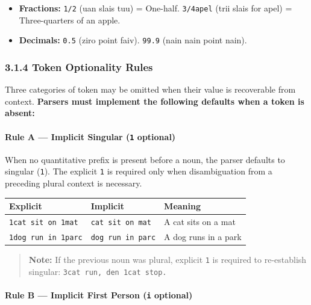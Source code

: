 \begin{itemize}
\tightlist
\item
  \textbf{Fractions:} \texttt{1/2} (uan slais tuu) = One-half.
  \texttt{3/4apel} (trii slais for apel) = Three-quarters of an apple.
\item
  \textbf{Decimals:} \texttt{0.5} (ziro point faiv). \texttt{99.9} (nain
  nain point nain).
\end{itemize}

\subsubsection{3.1.4 Token Optionality
Rules}\label{token-optionality-rules}

Three categories of token may be omitted when their value is recoverable
from context. \textbf{Parsers must implement the following defaults when
a token is absent:}

\paragraph{\texorpdfstring{Rule A --- Implicit Singular (\texttt{1}
optional)}{Rule A --- Implicit Singular (1 optional)}}\label{rule-a-implicit-singular-1-optional}

When no quantitative prefix is present before a noun, the parser
defaults to singular (\texttt{1}). The explicit \texttt{1} is required
only when disambiguation from a preceding plural context is necessary.

{\def\LTcaptype{} %
\begin{longtable}[]{@{}lll@{}}
\toprule\noalign{}
Explicit & Implicit & Meaning \\
\midrule\noalign{}
\endhead
\bottomrule\noalign{}
\endlastfoot
\texttt{1cat\ sit\ on\ 1mat} & \texttt{cat\ sit\ on\ mat} & A cat sits
on a mat \\
\texttt{1dog\ run\ in\ 1parc} & \texttt{dog\ run\ in\ parc} & A dog runs
in a park \\
\end{longtable}
}

\begin{quote}
\textbf{Note:} If the previous noun was plural, explicit \texttt{1} is
required to re-establish singular: \texttt{3cat\ run,\ den\ 1cat\ stop.}
\end{quote}

\paragraph{\texorpdfstring{Rule B --- Implicit First Person (\texttt{i}
optional)}{Rule B --- Implicit First Person (i optional)}}\label{rule-b-implicit-first-person-i-optional}

